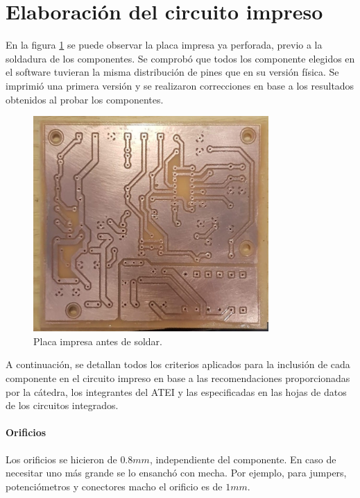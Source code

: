\section{Elaboración del circuito impreso}

En la figura \ref{fig:pcb-implementada} se puede observar la placa impresa ya perforada,
previo a la soldadura de los componentes.
Se comprobó que todos los componente elegidos en el software tuvieran la misma distribución de pines que en su versión física. 
Se imprimió una primera versión y se realizaron correcciones en base a los resultados obtenidos al probar los componentes. \cite{pcb-atei}

\begin{figure}[H]
    \centering
    \includegraphics[width=0.8\textwidth]{images/pcb-implementada.jpeg}
    \caption{Placa impresa antes de soldar.}
    \label{fig:pcb-implementada}
\end{figure}

A continuación, se detallan todos los criterios aplicados para la inclusión de cada componente en el circuito impreso en base a las recomendaciones 
proporcionadas por la cátedra, los integrantes del ATEI y las especificadas en las hojas de datos de los circuitos integrados.

\paragraph{Orificios}

Los orificios se hicieron de $0.8mm$, independiente del componente. En caso de necesitar uno más grande se lo ensanchó con mecha.
Por ejemplo, para jumpers, potenciómetros y conectores macho el orificio es de $1mm$. 

